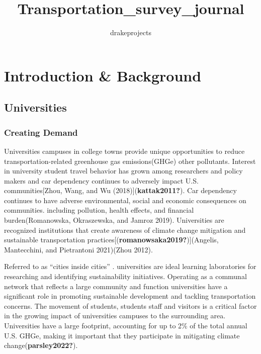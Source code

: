\documentclass[
  letterpaper,
  DIV=11,
  numbers=noendperiod]{scrartcl}
\title{Transportation\_survey\_journal}
\author{drakeprojects}
\date{}
\renewcommand*\contentsname{Table of contents}
\newcommand\contentsname{Table of contents}
\begin{document}
\maketitle

\renewcommand*\contentsname{Table of contents}
{
\hypersetup{linkcolor=}
\setcounter{tocdepth}{3}
\tableofcontents
}

\section{Introduction \& Background}\label{introduction-background}

\subsection{Universities}\label{universities}

\subsubsection{Creating Demand}\label{creating-demand}

Universities campuses in college towns provide unique opportunities to
reduce transportation-related greenhouse gas emissions(GHGe) other
pollutants. Interest in university student travel behavior has grown
among researchers and policy makers and car dependency continues to
adversely impact U.S. communities{[}Zhou, Wang, and Wu
(2018){]}(\textbf{kattak2011?}). Car dependency continues to have
adverse environmental, social and economic consequences on communities.
including pollution, health effects, and financial burden(Romanowska,
Okraszewska, and Jamroz 2019). Universities are recognized institutions
that create awareness of climate change mitigation and sustainable
transportation practices{[}(\textbf{romanowsaka2019?}){]}(Angelis,
Mantecchini, and Pietrantoni 2021)(Zhou 2012).

Referred to as ``cities inside cities'' . universities are ideal
learning laboratories for researching and identifying sustainability
initiatives. Operating as a communal network that reflects a large
community and function universities have a significant role in promoting
sustainable development and tackling transportation concerns. The
movement of students, students staff and visitors is a critical factor
in the growing impact of universities campuses to the surrounding area.
Universities have a large footprint, accounting for up to 2\% of the
total annual U.S. GHGe, making it important that they participate in
mitigating climate change(\textbf{parsley2022?}).
\end{document}
